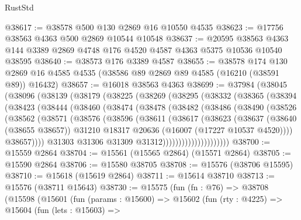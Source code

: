 \begin{lexlean}{RustStd}
\begin{coremodule}
@38617 := @38578 @500 @130 @2869 @16 @10550 @4535
@38623 := @17756 @38563 @4363 @500 @2869 @10544 @10548
@38637 := @20595
    @38563
    @4363
    @144
    @3389
    @2869
    @4748
    @176
    @4520
    @4587
    @4363
    @5375
    @10536
    @10540
    @38595
@38640 := @38573 @176 @3389 @4587
@38655 := @38578
    @174
    @130
    @2869
    @16
    @4585
    @4535
    (@38586 @89 @2869 @89 @4585 (@16210 (@38591 @89)) @16432)
@38657 := @16018 @38563 @4363
@38699 := @37984
    (@38045
      (@38096
        (@38139
          (@38179
            (@38225
              (@38269
                (@38295
                  (@38332
                    (@38365
                      (@38394
                        (@38423
                          (@38444
                            (@38460
                              (@38474
                                (@38478
                                  (@38482
                                    (@38486
                                      (@38490
                                        (@38526
                                          (@38562
                                            (@38571
                                              (@38576
                                                (@38596
                                                  (@38611
                                                    (@38617
                                                      (@38623
                                                        (@38637
                                                          (@38640 (@38655 @38657))
                                                          @31210
                                                          @18317
                                                          @20636
                                                          (@16007 (@17227 @10537 @4520))))
                                                      @38657))))
                                              @31303
                                              @31306
                                              @31309
                                              @31312)))))))))))))))))))))
@38700 := @15559 @2864
@38704 := @15561 (@15565 @2864) (@15571 @2864)
@38705 := @15590 @2864
@38706 := @15580 @38705
@38708 := @15576 (@38706 @15595)
@38710 := @15618 (@15619 @2864)
@38711 := @15614 @38710
@38713 := @15576 (@38711 @15643)
@38730 := @15575
    (fun (fn : @76) =>
    @38708
      (@15598
        (@15601
          (fun (params : @15600) =>
          @15602
            (fun (rty : @4225) =>
            @15604
              (fun (lets : @15603) =>

\end{coremodule}
\end{lexlean}
